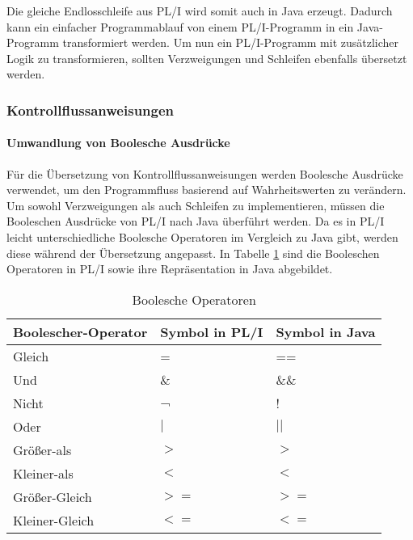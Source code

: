 Die gleiche Endlosschleife aus PL/I wird somit auch in Java erzeugt.
Dadurch kann ein einfacher Programmablauf von einem PL/I-Programm in ein Java-Programm transformiert werden.
Um nun ein PL/I-Programm mit zusätzlicher Logik zu transformieren, sollten Verzweigungen und Schleifen ebenfalls übersetzt werden.

\pagebreak
\subsubsection{Kontrollflussanweisungen}
\paragraph*{Umwandlung von Boolesche Ausdrücke}
Für die Übersetzung von Kontrollflussanweisungen werden Boolesche Ausdrücke verwendet, um den Programmfluss basierend auf Wahrheitswerten zu verändern. Um sowohl Verzweigungen als auch Schleifen zu implementieren, müssen die Booleschen Ausdrücke von PL/I nach Java überführt werden. Da es in PL/I leicht unterschiedliche Boolesche Operatoren im Vergleich zu Java gibt, werden diese während der Übersetzung angepasst. In Tabelle \ref{tab:booloperator} sind die Booleschen Operatoren in PL/I sowie ihre Repräsentation in Java abgebildet.


\begin{table}[h]
	\centering
	\begin{tabularx}{\textwidth}{|X|X|X|}
		\hline
		\textbf{Boolescher-Operator} & \textbf{Symbol in PL/I} & \textbf{Symbol in Java}  \\
		\hline
		Gleich & = & ==  \\
		Und & \& & \&\& \\
		Nicht & ¬ & ! \\
		Oder & $\mid$ &	$\mid$$\mid$ \\
		Größer-als & $>$ & $>$ \\
		Kleiner-als & $<$ & $<$ \\
		Größer-Gleich & $>=$ & $>=$ \\
		Kleiner-Gleich & $<=$ & $<=$ \\
		\hline
		
	\end{tabularx}
	\caption{Boolesche Operatoren \label{tab:booloperator}}
\end{table}



